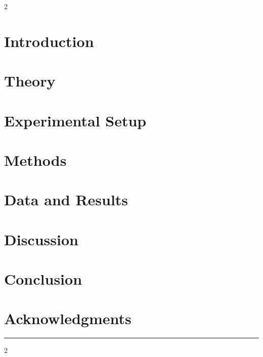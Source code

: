 \documentclass[12pt,a4paper]{article}
\begin{document}
    \begin{multicols}{2}

        \section{Introduction}\label{sec:introduction}
        

        \section{Theory}\label{sec:theory}
        

        \section{Experimental Setup}\label{sec:experimental_setup}
        

        \section{Methods}\label{sec:methods}
        

        \section{Data and Results}\label{sec:data_and_results}
        

        \section{Discussion}\label{sec:discussion}
        

        \section{Conclusion}\label{sec:conclusion}
        

        \section*{Acknowledgments}\label{sec:acknowledgments}
        

        \appendix
        

    \end{multicols}

    \begin{center}
        \rule{0.5\linewidth}{0.5pt}
    \end{center}

    \setlength{\multicolsep}{0pt}
    \begin{multicols}{2}
        \raggedright
        \renewcommand{\refname}{}
        
        
    \end{multicols}

\end{document}
